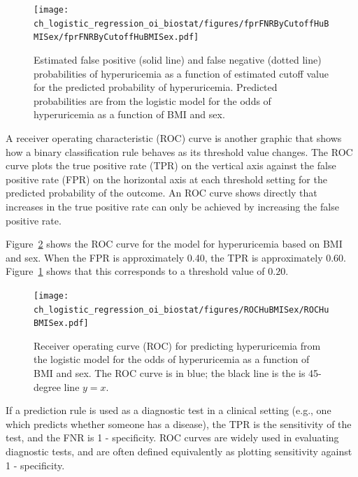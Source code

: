 \begin{figure}[!tbh]
  \centering
  \texttt{[image: ch\_logistic\_regression\_oi\_biostat/figures/fprFNRByCutoffHuBMISex/fprFNRByCutoffHuBMISex.pdf]}
    \caption{Estimated false positive (solid line) and false negative (dotted line) probabilities of hyperuricemia as a function of estimated cutoff value for the predicted probability of hyperuricemia.  Predicted probabilities are from the logistic model for the odds of hyperuricemia as a function of BMI and sex.}
    \label{figure:fprFNRByCutoffHuBMISex}
\end{figure}

A receiver operating characteristic (ROC) curve  is another graphic that shows how a binary classification rule behaves as its threshold value changes. The ROC curve plots the true positive rate (TPR) on the vertical axis against the false positive rate (FPR) on the horizontal axis at each threshold setting for the predicted probability of the outcome. An ROC curve shows directly that increases in the true positive rate can only be achieved by increasing the false positive rate. 


Figure~\ref{figure:ROCHuBMISex} shows the ROC curve for the model for hyperuricemia based on BMI and sex.  When the FPR is approximately 0.40, the TPR is approximately 0.60. Figure~\ref{figure:fprFNRByCutoffHuBMISex} shows that this corresponds to a threshold value of  $0.20$.


\begin{figure}[!tbh]
  \centering
  \texttt{[image: ch\_logistic\_regression\_oi\_biostat/figures/ROCHuBMISex/ROCHuBMISex.pdf]}
    \caption{Receiver operating curve (ROC) for predicting hyperuricemia from the logistic model for the odds of hyperuricemia as a function of BMI and sex. The ROC curve is in blue; the black line is the is 45-degree line $y = x$.}
    \label{figure:ROCHuBMISex}
\end{figure}

If a prediction rule is used as a diagnostic test in a clinical setting (e.g., one which predicts whether someone has a disease), the TPR is the sensitivity of the test, and the FNR is 1 - specificity.  ROC curves are widely used in evaluating diagnostic tests, and are often defined equivalently as plotting sensitivity against 1 - specificity.

